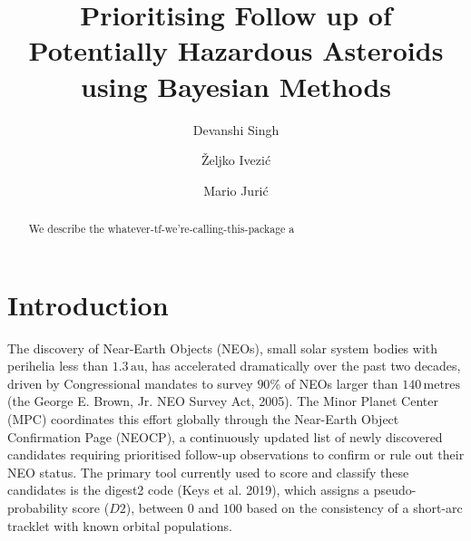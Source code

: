 \documentclass[linenumbers,trackchanges,twocolumn]{aastex701}
\begin{document}
\title{Prioritising Follow up of Potentially Hazardous Asteroids using Bayesian Methods}




\author[0009-0004-0059-3229]{Devanshi Singh}

\author[orcid=0000-0001-5250-2633]{\v{Z}eljko Ivezi\'{c}}

\author[orcid=0000-0003-1996-9252]{Mario Juri\'{c}}




%


\begin{abstract}
We describe the whatever-tf-we're-calling-this-package a 

\end{abstract}




\section{Introduction}
\label{sec:intro}

The discovery of Near-Earth Objects (NEOs), small solar system bodies with perihelia less than \( 1.3 \, \text{au} \), has accelerated dramatically over the past two decades, driven by Congressional mandates to survey \( 90\% \) of NEOs larger than \( 140 \, \text{metres} \) (the George E. Brown, Jr. NEO Survey Act, 2005). The Minor Planet Center (MPC) coordinates this effort globally through the Near-Earth Object Confirmation Page (NEOCP), a continuously updated list of newly discovered candidates requiring prioritised follow-up observations to confirm or rule out their NEO status. The primary tool currently used to score and classify these candidates is the digest2 code (Keys et al. 2019), which assigns a pseudo-probability score (\( D2 \)), between \( 0 \) and \( 100 \) based on the consistency of a short-arc tracklet with known orbital populations.
\end{document}
